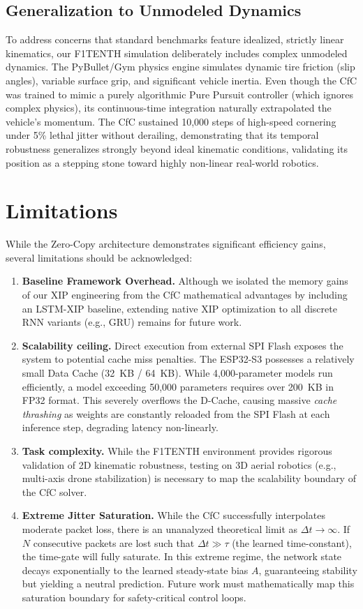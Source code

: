 \documentclass[conference]{IEEEtran}
\begin{document}
\subsection{Generalization to Unmodeled Dynamics}
\label{sec:generalization}
To address concerns that standard benchmarks feature idealized, strictly linear kinematics, our F1TENTH simulation deliberately includes complex unmodeled dynamics. The PyBullet/Gym physics engine simulates dynamic tire friction (slip angles), variable surface grip, and significant vehicle inertia. Even though the CfC was trained to mimic a purely algorithmic Pure Pursuit controller (which ignores complex physics), its continuous-time integration naturally extrapolated the vehicle's momentum. The CfC sustained 10,000 steps of high-speed cornering under 5\% lethal jitter without derailing, demonstrating that its temporal robustness generalizes strongly beyond ideal kinematic conditions, validating its position as a stepping stone toward highly non-linear real-world robotics.

\section{Limitations}
While the Zero-Copy architecture demonstrates significant efficiency gains, several limitations should be acknowledged:
\begin{enumerate}
    \item \textbf{Baseline Framework Overhead.} Although we isolated the memory gains of our XIP engineering from the CfC mathematical advantages by including an LSTM-XIP baseline, extending native XIP optimization to all discrete RNN variants (e.g., GRU) remains for future work.
    \item \textbf{Scalability ceiling.} Direct execution from external SPI Flash exposes the system to potential cache miss penalties. The ESP32-S3 possesses a relatively small Data Cache (32~KB / 64~KB). While 4,000-parameter models run efficiently, a model exceeding 50,000 parameters requires over 200~KB in FP32 format. This severely overflows the D-Cache, causing massive \textit{cache thrashing} as weights are constantly reloaded from the SPI Flash at each inference step, degrading latency non-linearly.
    \item \textbf{Task complexity.} While the F1TENTH environment provides rigorous validation of 2D kinematic robustness, testing on 3D aerial robotics (e.g., multi-axis drone stabilization) is necessary to map the scalability boundary of the CfC solver.
    \item \textbf{Extreme Jitter Saturation.} While the CfC successfully interpolates moderate packet loss, there is an unanalyzed theoretical limit as $\Delta t \to \infty$. If $N$ consecutive packets are lost such that $\Delta t \gg \tau$ (the learned time-constant), the time-gate will fully saturate. In this extreme regime, the network state decays exponentially to the learned steady-state bias $A$, guaranteeing stability but yielding a neutral prediction. Future work must mathematically map this saturation boundary for safety-critical control loops.
\end{enumerate}
\end{document}
